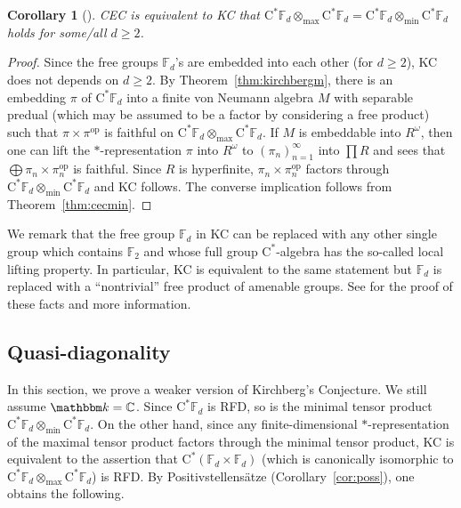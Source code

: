 \documentclass[12pt]{amsart}
\newtheorem{cor}[thm]{Corollary}
\theoremstyle{definition}
\begin{document}
\begin{cor}[\cite{kirchberg}]
CEC is equivalent to KC that
$\mathrm{C^*}{{\mathbb F}}_d\otimes_{\max}\mathrm{C^*}{{\mathbb F}}_d
=\mathrm{C^*}{{\mathbb F}}_d\otimes_{\min}\mathrm{C^*}{{\mathbb F}}_d$
holds for some/all $d\geq2$.
\end{cor}
\begin{proof}
Since the free groups ${{\mathbb F}}_d$'s are embedded into each other (for $d\geq2$),
KC does not depends on $d\geq2$.
By Theorem~\ref{thm:kirchbergm}, there is an embedding $\pi$
of $\mathrm{C^*}{{\mathbb F}}_d$ into a finite von Neumann algebra $M$ with separable predual
(which may be assumed to be a factor by considering a free product)
such that $\pi\times\pi^{\mathrm{op}}$ is faithful on $\mathrm{C^*}{{\mathbb F}}_d\otimes_{\max}\mathrm{C^*}{{\mathbb F}}_d$.
If $M$ is embeddable into $R^\omega$, then one can lift the {$*$-repre\-sen\-ta\-tion\xspace} $\pi$ into $R^\omega$ to
$(\pi_n)_{n=1}^\infty$ into $\prod R$ and sees that $\bigoplus\pi_n\times\pi_n^{\mathrm{op}}$
is faithful. Since $R$ is hyperfinite, $\pi_n\times\pi_n^{\mathrm{op}}$ factors through
$\mathrm{C^*}{{\mathbb F}}_d\otimes_{\min}\mathrm{C^*}{{\mathbb F}}_d$ and KC follows.
The converse implication follows from Theorem~\ref{thm:cecmin}.
\end{proof}
We remark that the free group ${{\mathbb F}}_d$ in KC
can be replaced with any other single
group which contains ${{\mathbb F}}_2$ and whose full group {$\mathrm{C}^*$-alge\-bra\xspace} has the so-called local lifting property.
In particular, KC is equivalent to the same statement but
${{\mathbb F}}_d$ is replaced with a ``nontrivial'' free product of amenable groups.
See \cite{bo,kirchberg,qwep} for the proof of these facts and more information.
\subsection{Quasi-diagonality}\label{sec:qd}
In this section, we prove a weaker version of Kirchberg's Conjecture.
We still assume ${{\mathbbm k}}={{\mathbb C}}$.
Since $\mathrm{C^*}{{\mathbb F}}_d$ is RFD, so is the minimal tensor product
$\mathrm{C^*}{{\mathbb F}}_d\otimes_{\min}\mathrm{C^*}{{\mathbb F}}_d$.
On the other hand, since any finite-dimensional {$*$-repre\-sen\-ta\-tion\xspace} of
the maximal tensor product factors through the minimal tensor product,
KC is equivalent to the assertion that
$\mathrm{C^*}({{\mathbb F}}_d\times{{\mathbb F}}_d)$ (which is canonically isomorphic
to $\mathrm{C^*}{{\mathbb F}}_d\otimes_{\max}\mathrm{C^*}{{\mathbb F}}_d$) is RFD.
By {Positiv\-stellen\-s\"atze\xspace} (Corollary~\ref{cor:poss}), one obtains the following.
\end{document}

